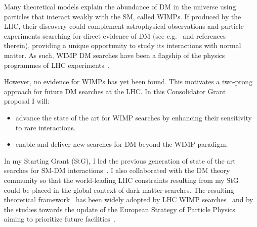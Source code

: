\documentclass[11pt,a4paper]{article}
\begin{document}
Many theoretical models explain the abundance of DM in the universe using particles that interact weakly with the SM, called WIMPs. 
If produced by the LHC, their discovery could complement astrophysical observations and particle experiments searching for direct evidence of DM (see e.g.~\cite{Boveia:2018yeb} and references therein), providing a unique opportunity to study its interactions with normal matter. 
As such, WIMP DM searches have been a flagship of the physics programmes of LHC experiments~\cite{Boveia:2018yeb,Aaboud:2019yqu,Canepa:2019hph}. %

However, no evidence for WIMPs has yet been found. This motivates a two-prong approach for future DM searches at the LHC. In this Consolidator Grant proposal I will:
\begin{itemize}
    \item advance the state of the art for WIMP searches by enhancing their sensitivity to rare interactions.
    \item enable and deliver new searches for DM beyond the WIMP paradigm. 
\end{itemize}

In my Starting Grant (StG), I led the previous generation of state of the art searches for SM-DM interactions~\cite{Aaboud:2018fzt,Aaboud:2019zxd}. 
I also collaborated with the DM theory community so that the world-leading LHC constraints resulting from my StG could be placed in the global context of dark matter searches. 
The resulting theoretical framework~\cite{Abercrombie:2015wmb} has been widely adopted by LHC WIMP searches~\cite{Aaboud:2019yqu} and by the studies towards the update of the European Strategy of Particle Physics aiming to prioritize future facilities~\cite{Strategy:2019vxc}.  
\end{document}

